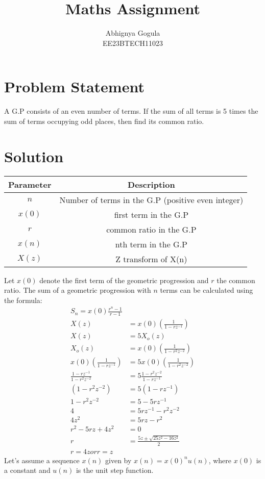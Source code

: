 \documentclass{article}
\begin{document}
\title{Maths Assignment}
\author{Abhignya Gogula\\
        EE23BTECH11023}
\maketitle

\section*{Problem Statement}
A G.P consists of an even number of terms. If the sum of all terms is 5 times the sum of terms occupying odd places, then find its common ratio.

\section*{Solution}
\begin{table}[h!]
\centering
\begin{tabular}{|c|c|}
\hline
Parameter & Description \\
\hline
\( n \) & Number of terms in the G.P (positive even integer) \\
\hline
\(x(0) \) & first term in the G.P \\
\hline
\( r \) & common ratio in the G.P \\
\hline
\( x(n) \) & nth term in the G.P \\
\hline
\( X(z) \) & Z transform of X(n) \\
\hline
\end{tabular}
\end{table}

Let \( x(0) \) denote the first term of the geometric progression and \( r \) the common ratio. The sum of a geometric progression with \( n \) terms can be calculated using the formula:
\begin{align}
 S_n = x(0) \frac{{r^n - 1}}{{r - 1}} \\
X(z) &= x(0)\left(\frac{1}{1 - rz^{-1}}\right) \\
X(z) &= 5 X_o(z) \\
X_o(z) &= x(0)\left(\frac{1}{1 - r^2z^{-2}}\right) \\
x(0)\left(\frac{1}{1 - rz^{-1}}\right) &= 5 x(0)\left(\frac{1}{1 - r^2z^{-2}}\right) \\
\frac{1 - rz^{-1}}{1 - r^2z^{-2}} &= 5 \frac{1 - r^2z^{-2}}{1 - rz^{-1}} \\
(1 - r^2z^{-2}) &= 5 (1 - rz^{-1}) \\
1 - r^2z^{-2} &= 5 - 5rz^{-1} \\
4 &= 5rz^{-1} - r^2z^{-2} \\
4z^2 &= 5rz - r^2 \\
r^2 - 5rz + 4z^2 &= 0 \\
r &= \frac{5z \pm \sqrt{25z^2 - 16z^2}}{2}\\
r=4z or r=z
\end{align}
Let's assume a sequence \( x(n) \) given by \( x(n) =x(0)^n u(n) \), where \( x(0) \) is a constant and \( u(n) \) is the unit step function.
\end{document}
